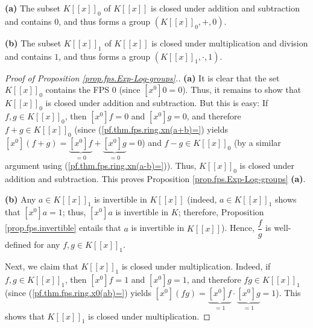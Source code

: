 \begin{proposition}
\label{prop.fps.Exp-Log-groups}\textbf{(a)} The subset $K\left[  \left[
x\right]  \right]  _{0}$ of $K\left[  \left[  x\right]  \right]  $ is closed
under addition and subtraction and contains $0$, and thus forms a group
$\left(  K\left[  \left[  x\right]  \right]  _{0},+,0\right)  $. \medskip

\textbf{(b)} The subset $K\left[  \left[  x\right]  \right]  _{1}$ of
$K\left[  \left[  x\right]  \right]  $ is closed under multiplication and
division and contains $1$, and thus forms a group $\left(  K\left[  \left[
x\right]  \right]  _{1},\cdot,1\right)  $.
\end{proposition}

\begin{proof}
[Proof of Proposition \ref{prop.fps.Exp-Log-groups}.]\textbf{(a)} It is clear
that the set $K\left[  \left[  x\right]  \right]  _{0}$ contains the FPS $0$
(since $\left[  x^{0}\right]  0=0$). Thus, it remains to show that $K\left[
\left[  x\right]  \right]  _{0}$ is closed under addition and subtraction. But
this is easy: If $f,g\in K\left[  \left[  x\right]  \right]  _{0}$, then
$\left[  x^{0}\right]  f=0$ and $\left[  x^{0}\right]  g=0$, and therefore
$f+g\in K\left[  \left[  x\right]  \right]  _{0}$ (since
(\ref{pf.thm.fps.ring.xn(a+b)=}) yields $\left[  x^{0}\right]  \left(
f+g\right)  =\underbrace{\left[  x^{0}\right]  f}_{=0}+\underbrace{\left[
x^{0}\right]  g}_{=0}=0$) and $f-g\in K\left[  \left[  x\right]  \right]
_{0}$ (by a similar argument using (\ref{pf.thm.fps.ring.xn(a-b)=})). Thus,
$K\left[  \left[  x\right]  \right]  _{0}$ is closed under addition and
subtraction. This proves Proposition \ref{prop.fps.Exp-Log-groups}
\textbf{(a)}.

\textbf{(b)} Any $a\in K\left[  \left[  x\right]  \right]  _{1}$ is invertible
in $K\left[  \left[  x\right]  \right]  $ (indeed, $a\in K\left[  \left[
x\right]  \right]  _{1}$ shows that $\left[  x^{0}\right]  a=1$; thus,
$\left[  x^{0}\right]  a$ is invertible in $K$; therefore, Proposition
\ref{prop.fps.invertible} entails that $a$ is invertible in $K\left[  \left[
x\right]  \right]  $). Hence, $\dfrac{f}{g}$ is well-defined for any $f,g\in
K\left[  \left[  x\right]  \right]  _{1}$.

Next, we claim that $K\left[  \left[  x\right]  \right]  _{1}$ is closed under
multiplication. Indeed, if $f,g\in K\left[  \left[  x\right]  \right]  _{1}$,
then $\left[  x^{0}\right]  f=1$ and $\left[  x^{0}\right]  g=1$, and
therefore $fg\in K\left[  \left[  x\right]  \right]  _{1}$ (since
(\ref{pf.thm.fps.ring.x0(ab)=}) yields $\left[  x^{0}\right]  \left(
fg\right)  =\underbrace{\left[  x^{0}\right]  f}_{=1}\cdot\underbrace{\left[
x^{0}\right]  g}_{=1}=1$). This shows that $K\left[  \left[  x\right]
\right]  _{1}$ is closed under multiplication.


\end{proof}

